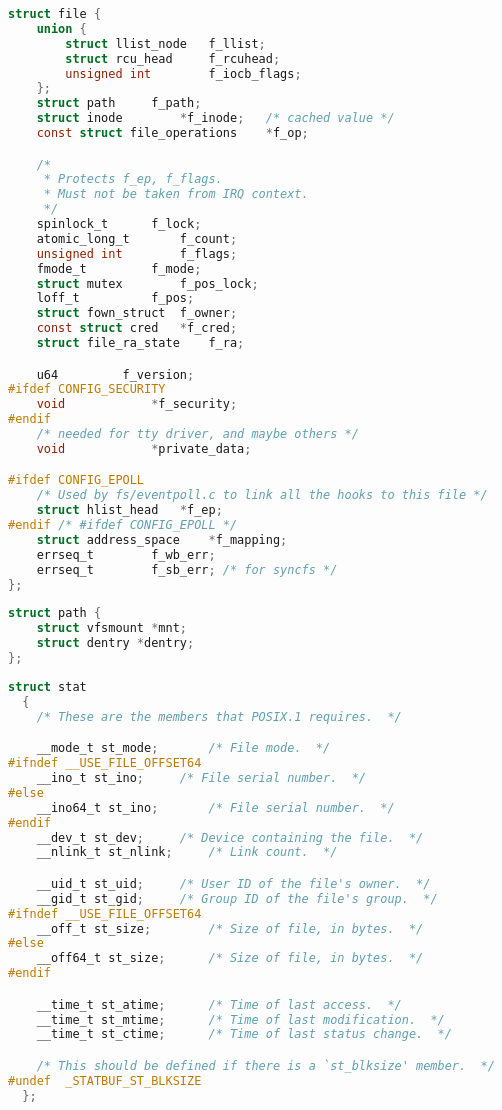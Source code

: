 \begin{lstlisting}[language=c, caption={struct file}]
struct file {
	union {
		struct llist_node	f_llist;
		struct rcu_head 	f_rcuhead;
		unsigned int 		f_iocb_flags;
	};
	struct path		f_path;
	struct inode		*f_inode;	/* cached value */
	const struct file_operations	*f_op;

	/*
	 * Protects f_ep, f_flags.
	 * Must not be taken from IRQ context.
	 */
	spinlock_t		f_lock;
	atomic_long_t		f_count;
	unsigned int 		f_flags;
	fmode_t			f_mode;
	struct mutex		f_pos_lock;
	loff_t			f_pos;
	struct fown_struct	f_owner;
	const struct cred	*f_cred;
	struct file_ra_state	f_ra;

	u64			f_version;
#ifdef CONFIG_SECURITY
	void			*f_security;
#endif
	/* needed for tty driver, and maybe others */
	void			*private_data;

#ifdef CONFIG_EPOLL
	/* Used by fs/eventpoll.c to link all the hooks to this file */
	struct hlist_head	*f_ep;
#endif /* #ifdef CONFIG_EPOLL */
	struct address_space	*f_mapping;
	errseq_t		f_wb_err;
	errseq_t		f_sb_err; /* for syncfs */
};
\end{lstlisting}

\begin{lstlisting}[language=c, caption={struct path}]
struct path {
	struct vfsmount *mnt;
	struct dentry *dentry;
};
\end{lstlisting}

\begin{lstlisting}[language=c, caption={struct stat}]
struct stat
  {
    /* These are the members that POSIX.1 requires.  */

    __mode_t st_mode;		/* File mode.  */
#ifndef __USE_FILE_OFFSET64
    __ino_t st_ino;		/* File serial number.  */
#else
    __ino64_t st_ino;		/* File serial number.	*/
#endif
    __dev_t st_dev;		/* Device containing the file.  */
    __nlink_t st_nlink;		/* Link count.  */

    __uid_t st_uid;		/* User ID of the file's owner.  */
    __gid_t st_gid;		/* Group ID of the file's group.  */
#ifndef __USE_FILE_OFFSET64
    __off_t st_size;		/* Size of file, in bytes.  */
#else
    __off64_t st_size;		/* Size of file, in bytes.  */
#endif

    __time_t st_atime;		/* Time of last access.  */
    __time_t st_mtime;		/* Time of last modification.  */
    __time_t st_ctime;		/* Time of last status change.  */

    /* This should be defined if there is a `st_blksize' member.  */
#undef	_STATBUF_ST_BLKSIZE
  };
\end{lstlisting}


